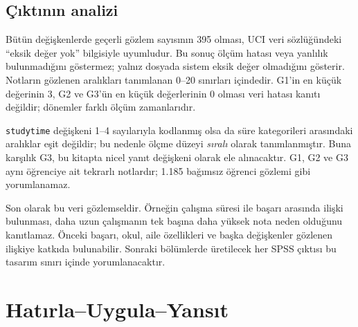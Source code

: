 \subsection{Çıktının analizi}

Bütün değişkenlerde geçerli gözlem sayısının 395 olması, UCI veri sözlüğündeki
``eksik değer yok'' bilgisiyle uyumludur. Bu sonuç ölçüm hatası veya yanlılık
bulunmadığını göstermez; yalnız dosyada sistem eksik değer olmadığını gösterir.
Notların gözlenen aralıkları tanımlanan 0--20 sınırları içindedir. G1'in en
küçük değerinin 3, G2 ve G3'ün en küçük değerlerinin 0 olması veri hatası
kanıtı değildir; dönemler farklı ölçüm zamanlarıdır.

\texttt{studytime} değişkeni 1--4 sayılarıyla kodlanmış olsa da süre
kategorileri arasındaki aralıklar eşit değildir; bu nedenle ölçme düzeyi
\emph{sıralı} olarak tanımlanmıştır. Buna karşılık G3, bu kitapta nicel yanıt
değişkeni olarak ele alınacaktır. G1, G2 ve G3 aynı öğrenciye ait tekrarlı
notlardır; 1.185 bağımsız öğrenci gözlemi gibi yorumlanamaz.

Son olarak bu veri gözlemseldir. Örneğin çalışma süresi ile başarı arasında
ilişki bulunması, daha uzun çalışmanın tek başına daha yüksek nota neden
olduğunu kanıtlamaz. Önceki başarı, okul, aile özellikleri ve başka değişkenler
gözlenen ilişkiye katkıda bulunabilir. Sonraki bölümlerde üretilecek her SPSS
çıktısı bu tasarım sınırı içinde yorumlanacaktır.





\section*{Hatırla--Uygula--Yansıt}

